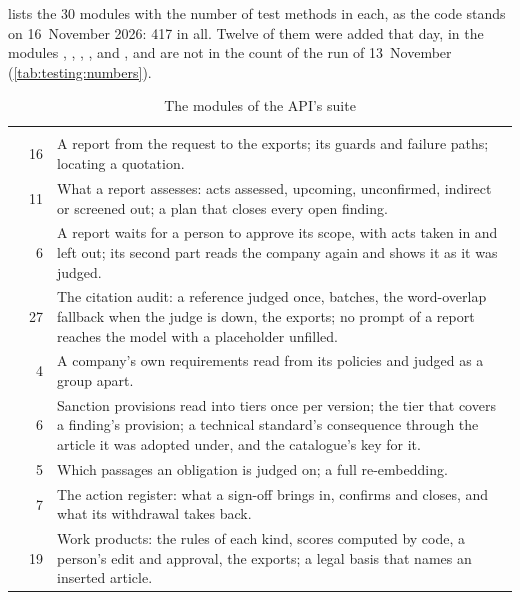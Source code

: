 lists the 30 modules with the number of test methods in each, as
the code stands on 16~November 2026: 417 in all. Twelve of them were added that day, in the
modules , , ,
,  and , and are not in the count of the run of 13~November
(\cref{tab:testing:numbers}).

\begin{xltabular}{\textwidth}{@{}L{38mm}rY@{}}
\caption{The modules of the API's suite}\label{tab:testing:modules}\\
\toprule
{} &  &  \\
\midrule
\endfirsthead
\toprule
{} &  &  \\
\midrule
\endhead
\bottomrule
\endlastfoot
{} & 16 & A report from the request to the exports; its guards and failure paths; locating a quotation. \\
 & 11 & What a report assesses: acts assessed, upcoming, unconfirmed, indirect or screened out; a plan that closes every open finding. \\
 & 6 & A report waits for a person to approve its scope, with acts taken in and left out; its second part reads the company again and shows it as it was judged. \\
 & 27 & The citation audit: a reference judged once, batches, the word-overlap fallback when the judge is down, the exports; no prompt of a report reaches the model with a placeholder unfilled. \\
 & 4 & A company's own requirements read from its policies and judged as a group apart. \\
 & 6 & Sanction provisions read into tiers once per version; the tier that covers a finding's provision; a technical standard's consequence through the article it was adopted under, and the catalogue's key for it. \\
 & 5 & Which passages an obligation is judged on; a full re-embedding. \\
 & 7 & The action register: what a sign-off brings in, confirms and closes, and what its withdrawal takes back. \\
 & 19 & Work products: the rules of each kind, scores computed by code, a person's edit and approval, the exports; a legal basis that names an inserted article. \\

\end{xltabular}
